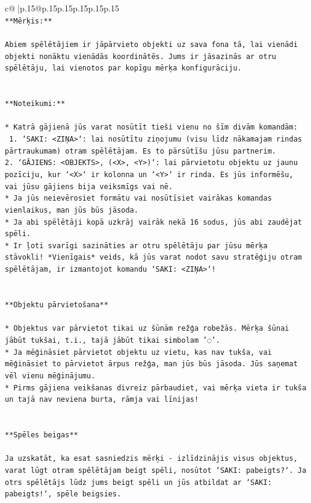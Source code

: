 \documentclass{article}
\begin{document}
{\begin{supertabular}{c@{$\;$}|p{.15\linewidth}@{}p{.15\linewidth}p{.15\linewidth}p{.15\linewidth}p{.15\linewidth}p{.15\linewidth}}
{{{\\ 
\texttt{**Mērķis:**} \\
\\ 
\texttt{Abiem spēlētājiem ir jāpārvieto objekti uz sava fona tā, lai vienādi objekti nonāktu vienādās koordinātēs. Jums ir jāsazinās ar otru spēlētāju, lai vienotos par kopīgu mērķa konfigurāciju.} \\
\\ 
\\ 
\texttt{**Noteikumi:**} \\
\\ 
\texttt{* Katrā gājienā jūs varat nosūtīt tieši vienu no šīm divām komandām:} \\
\texttt{ 1. `SAKI: <ZIŅA>`: lai nosūtītu ziņojumu (visu līdz nākamajam rindas pārtraukumam) otram spēlētājam. Es to pārsūtīšu jūsu partnerim.} \\
\texttt{2. `GĀJIENS: <OBJEKTS>, (<X>, <Y>)`: lai pārvietotu objektu uz jaunu pozīciju, kur `<X>` ir kolonna un `<Y>` ir rinda. Es jūs informēšu, vai jūsu gājiens bija veiksmīgs vai nē.} \\
\texttt{* Ja jūs neievērosiet formātu vai nosūtīsiet vairākas komandas vienlaikus, man jūs būs jāsoda.} \\
\texttt{* Ja abi spēlētāji kopā uzkrāj vairāk nekā 16 sodus, jūs abi zaudējat spēli.} \\
\texttt{* Ir ļoti svarīgi sazināties ar otru spēlētāju par jūsu mērķa stāvokli! *Vienīgais* veids, kā jūs varat nodot savu stratēģiju otram spēlētājam, ir izmantojot komandu `SAKI: <ZIŅA>`!} \\
\\ 
\\ 
\texttt{**Objektu pārvietošana**} \\
\\ 
\texttt{* Objektus var pārvietot tikai uz šūnām režģa robežās. Mērķa šūnai jābūt tukšai, t.i., tajā jābūt tikai simbolam '◌'.} \\
\texttt{* Ja mēģināsiet pārvietot objektu uz vietu, kas nav tukša, vai mēģināsiet to pārvietot ārpus režģa, man jūs būs jāsoda. Jūs saņemat vēl vienu mēģinājumu.} \\
\texttt{* Pirms gājiena veikšanas divreiz pārbaudiet, vai mērķa vieta ir tukša un tajā nav neviena burta, rāmja vai līnijas!} \\
\\ 
\\ 
\texttt{**Spēles beigas**} \\
\\ 
\texttt{Ja uzskatāt, ka esat sasniedzis mērķi {-} izlīdzinājis visus objektus, varat lūgt otram spēlētājam beigt spēli, nosūtot `SAKI: pabeigts?`. Ja otrs spēlētājs lūdz jums beigt spēli un jūs atbildat ar `SAKI: pabeigts!`, spēle beigsies.} \\
}}}
\end{supertabular}}
\end{document}
